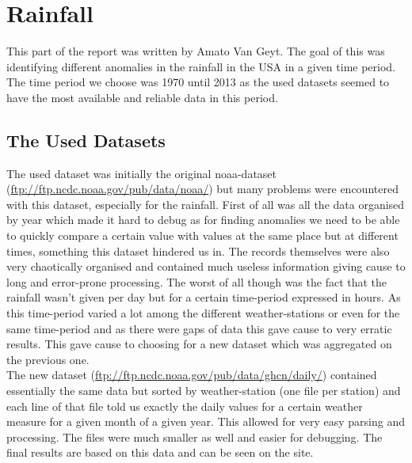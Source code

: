 \section{Rainfall}
This part of the report was written by Amato Van Geyt. The goal of this was identifying different anomalies in the rainfall in the USA in a given time period. The time period we choose was 1970 until 2013 as the used datasets seemed to have the most available and reliable data in this period. \\ 

\subsection{The Used Datasets}
The used dataset was initially the original noaa-dataset (\url{ftp://ftp.ncdc.noaa.gov/pub/data/noaa/}) but many problems were encountered with this dataset, especially for the rainfall. First of all was all the data organised by year which made it hard to debug as for finding anomalies we need to be able to quickly compare a certain value with values at the same place but at different times, something this dataset hindered us in. The records themselves were also very chaotically organised and contained much useless information giving cause to long and error-prone processing. The worst of all though was the fact that the rainfall wasn't given per day but for a certain time-period expressed in hours. As this time-period varied a lot among the different weather-stations or even for the same time-period and as there were gaps of data this gave cause to very erratic results. This gave cause to choosing for a new dataset which was aggregated on the previous one. \\ 
The new dataset (\url{ftp://ftp.ncdc.noaa.gov/pub/data/ghcn/daily/}) contained essentially the same data but sorted by weather-station (one file per station) and each line of that file told us exactly the daily values for a certain weather measure for a given month of a given year. This allowed for very easy parsing and processing. The files were much smaller as well and easier for debugging. The final results are based on this data and can be seen on the site.\\ 

